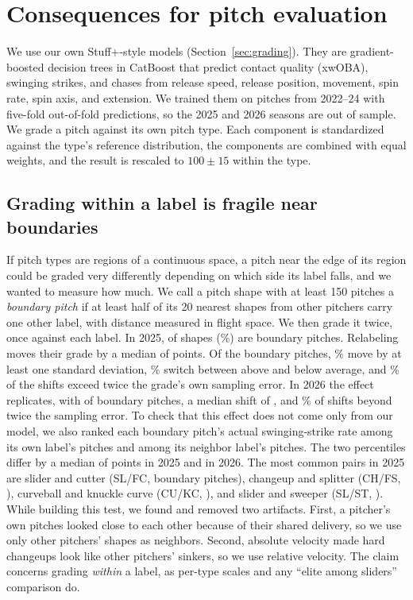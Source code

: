 \documentclass{article}
\theoremstyle{definition}
\theoremstyle{remark}
\begin{document}
\section{Consequences for pitch evaluation}\label{sec:consequences}
We use our own Stuff+-style models (Section~\ref{sec:grading}). They are gradient-boosted decision trees in CatBoost \parencite{dorogush2018catboost} that predict contact quality (xwOBA), swinging strikes, and chases from release speed, release position, movement, spin rate, spin axis, and extension. We trained them on \StuffTrainN{} pitches from 2022--24 with five-fold out-of-fold predictions, so the 2025 and 2026 seasons are out of sample.
We grade a pitch against its own pitch type. Each component is standardized against the type's reference distribution, the components are combined with equal weights, and the result is rescaled to $100 \pm 15$ within the type.

\subsection{Grading within a label is fragile near boundaries}\label{sec:labelfragile}
If pitch types are regions of a continuous space, a pitch near the edge of its region could be graded very differently depending on which side its label falls, and we wanted to measure how much.
We call a pitch shape with at least 150 pitches a \emph{boundary pitch} if at least half of its 20 nearest shapes from other pitchers carry one other label, with distance measured in flight space. We then grade it twice, once against each label.
In 2025, \LSTwentyFiveBoundary{} of \LSTwentyFiveEligible{} shapes (\LSTwentyFiveBoundaryPct\%) are boundary pitches.
Relabeling moves their grade by a median of \LSTwentyFiveShift{} points. Of the boundary pitches, \LSTwentyFiveOneSDPct\% move by at least one standard deviation, \LSTwentyFiveCrossPct\% switch between above and below average, and \LSTwentyFiveTwoSEPct\% of the shifts exceed twice the grade's own sampling error.
In 2026 the effect replicates, with \LSTwentySixBoundary{} of \LSTwentySixEligible{} boundary pitches, a median shift of \LSTwentySixShift, and \LSTwentySixTwoSEPct\% of shifts beyond twice the sampling error.
To check that this effect does not come only from our model, we also ranked each boundary pitch's actual swinging-strike rate among its own label's pitches and among its neighbor label's pitches. The two percentiles differ by a median of \LSTwentyFivePctChange{} points in 2025 and \LSTwentySixPctChange{} in 2026.
The most common pairs in 2025 are slider and cutter (SL/FC, \LSPairFCSL{} boundary pitches), changeup and splitter (CH/FS, \LSPairCHFS), curveball and knuckle curve (CU/KC, \LSPairCUKC), and slider and sweeper (SL/ST, \LSPairSLST).
While building this test, we found and removed two artifacts. First, a pitcher's own pitches looked close to each other because of their shared delivery, so we use only other pitchers' shapes as neighbors. Second, absolute velocity made hard changeups look like other pitchers' sinkers, so we use relative velocity.
The claim concerns grading \emph{within} a label, as per-type scales and any ``elite among sliders'' comparison do.
\end{document}
